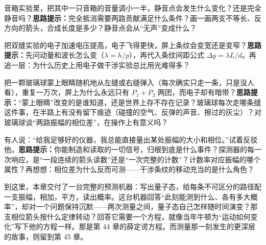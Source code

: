 \begin{puzzles}
\item 音箱实验里，把其中一只音箱的音量调小一半，静音点会发生什么变化？还是完全静音吗？\textbf{思路提示：}完全抵消需要两路贡献满足什么条件？画一画两支不等长、反方向的箭头，合成长度是多少？静音点会从“无声”变成什么？
\item 把双缝实验的电子加速电压提高，电子飞得更快，屏上条纹会变宽还是变窄？\textbf{思路提示：}先问动量和波长怎么变（\(\lambda = h/p\)），再代入条纹间距公式 \(\Delta y = \lambda L/d\)。再追一层：为什么历史上用电子做干涉实验总比用光难得多？
\item 把一颗玻璃球蒙上眼睛随机地从左缝或右缝弹入（每次确实只走一条，只是没人看），重复一万次，屏上为什么永远只有 \(P_1 + P_2\) 两团，而电子却有暗带？\textbf{思路提示：}“蒙上眼睛”改变的是谁知道，还是世界上存不存在记录？玻璃球每次走哪条缝这件事，在半路上有没有留下痕迹（碰撞的空气、反弹的声音、擦过的灰尘）？对玻璃球谈“两路振幅的相位差”，在操作上有意义吗？
\item 有人说：“给我足够好的仪器，我总能直接量出某处振幅的大小和相位。”试着反驳他。\textbf{思路提示：}你能制造和读取的一切信号，归根到底是什么事件？探测器的每一次响应，是“一段连续的箭头读数”还是“一次完整的计数”？计数率对应振幅的哪个属性？再想想：相位差为什么反而可测——干涉条纹的移动充当的是什么角色？
\end{puzzles}

到这里，本章交付了一台完整的预测机器：写出量子态，给每条不可区分的路径配一支振幅，相加，平方，读出概率。这台机器回答“此刻能测到什么、各有多大概率”，却对一个问题保持沉默——两次测量之间，量子态自己怎样随时间演变？那支相位箭头按什么定律转动？回答它需要一个方程，就像当年牛顿为“运动如何变化”写下他的方程一样。那是第 44 章的薛定谔方程。而测量那一刻发生的更深层的故事，则留到第 45 章。
